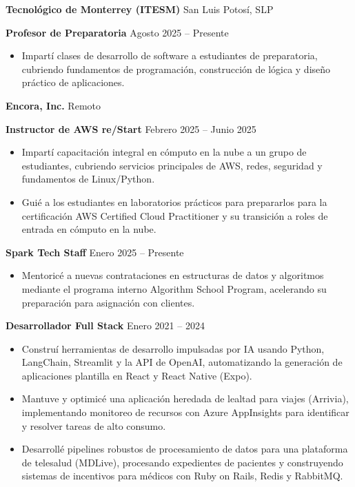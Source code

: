 \documentclass[11pt]{article}
\begin{document}
\textbf{Tecnológico de Monterrey (ITESM)} \hfill San Luis Potosí, SLP

\textbf{Profesor de Preparatoria} \hfill Agosto 2025 -- Presente
\begin{itemize}[noitemsep, topsep=0pt, partopsep=0pt, parsep=0pt]
    \item Impartí clases de desarrollo de software a estudiantes de preparatoria, cubriendo fundamentos de programación, construcción de lógica y diseño práctico de aplicaciones.
\end{itemize}

\vspace{8pt}

\textbf{Encora, Inc.} \hfill Remoto

\textbf{Instructor de AWS re/Start} \hfill Febrero 2025 -- Junio 2025
\begin{itemize}[noitemsep, topsep=0pt, partopsep=0pt, parsep=0pt]
    \item Impartí capacitación integral en cómputo en la nube a un grupo de estudiantes, cubriendo servicios principales de AWS, redes, seguridad y fundamentos de Linux/Python.
    \item Guié a los estudiantes en laboratorios prácticos para prepararlos para la certificación AWS Certified Cloud Practitioner y su transición a roles de entrada en cómputo en la nube.
\end{itemize}

\vspace{8pt}

\textbf{Spark Tech Staff} \hfill Enero 2025 -- Presente
\begin{itemize}[noitemsep, topsep=0pt, partopsep=0pt, parsep=0pt]
    \item Mentoricé a nuevas contrataciones en estructuras de datos y algoritmos mediante el programa interno Algorithm School Program, acelerando su preparación para asignación con clientes.
\end{itemize}

\vspace{8pt}

\textbf{Desarrollador Full Stack} \hfill Enero 2021 -- 2024
\begin{itemize}[noitemsep, topsep=0pt, partopsep=0pt, parsep=0pt]
    \item Construí herramientas de desarrollo impulsadas por IA usando Python, LangChain, Streamlit y la API de OpenAI, automatizando la generación de aplicaciones plantilla en React y React Native (Expo).
    \item Mantuve y optimicé una aplicación heredada de lealtad para viajes (Arrivia), implementando monitoreo de recursos con Azure AppInsights para identificar y resolver tareas de alto consumo.
    \item Desarrollé pipelines robustos de procesamiento de datos para una plataforma de telesalud (MDLive), procesando expedientes de pacientes y construyendo sistemas de incentivos para médicos con Ruby on Rails, Redis y RabbitMQ.
\end{itemize}
\end{document}
